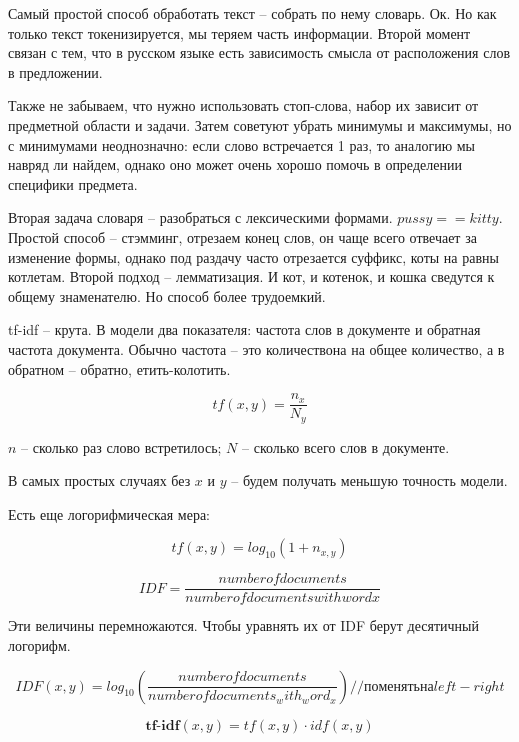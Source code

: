 Самый простой способ обработать текст -- собрать по нему словарь. Ок. Но как только текст токенизируется, мы теряем часть информации. Второй момент связан с тем, что в русском языке есть зависимость смысла от расположения слов в предложении.

Также не забываем, что нужно использовать стоп-слова, набор их зависит от предметной области и задачи. Затем советуют убрать минимумы и максимумы, но с минимумами неоднозначно: если слово встречается 1 раз, то аналогию мы навряд ли найдем, однако оно может очень хорошо помочь в определении специфики предмета.

Вторая задача словаря -- разобраться с лексическими формами. $pussy == kitty$. Простой способ -- стэмминг, отрезаем конец слов, он чаще всего отвечает за изменение формы, однако под раздачу часто отрезается суффикс, коты на равны котлетам. Второй подход -- лемматизация. И кот, и котенок, и кошка сведутся к общему знаменателю. Но способ более трудоемкий.

tf-idf -- крута. В модели два показателя: частота слов в документе и обратная частота документа. Обычно частота -- это количествона на общее количество, а в обратном -- обратно, етить-колотить.

\begin{equation}
    tf(x, y) = \frac{n_x}{N_y}
\end{equation}

$n$ -- сколько раз слово встретилось; $N$ -- сколько всего слов в документе.

В самых простых случаях без $x$ и $y$ -- будем получать меньшую точность модели.

Есть еще логорифмическая мера:

\begin{equation}
    tf(x, y) = log_{10}(1 + n_{x, y})
\end{equation}

\begin{equation}
    IDF = \frac{number of documents}{number of documents with word x}
\end{equation}

Эти величины перемножаются. Чтобы уравнять их от IDF берут десятичный логорифм.

\begin{equation}
    IDF(x, y) = log_{10}(\frac{number of documents}{number of documents_with_word_x}) // поменять на left-right
\end{equation}

\begin{equation}
    \textbf{tf-idf}(x, y) = tf(x, y) \cdot idf(x, y)
\end{equation}

